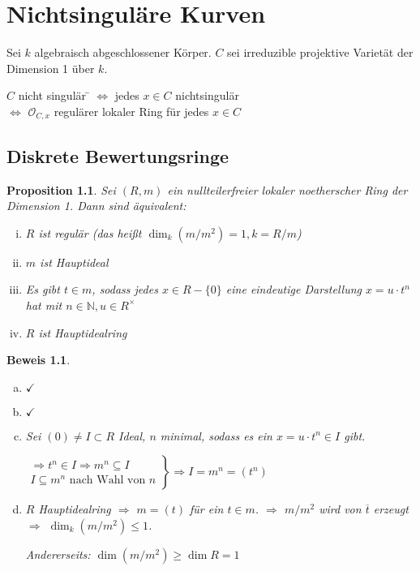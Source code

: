 \documentclass[a4paper, 12pt, numbers=noendperiod, chapterprefix=true]{scrbook}
\theoremstyle{break}
\newtheorem{Prop}[Def]{Proposition}
\theoremstyle{nonumberbreak}
\newtheorem{Bew}{Beweis}
\theoremstyle{nonumberplain}
\newcommand{\N}{\mathbb{N}}
\newcommand{\calO}{\mathcal{O}}
\begin{document}
\newpage

\chapter{Nichtsingul\"are Kurven}
\setcounter{section}{19}
Sei $k$ algebraisch abgeschlossener K\"orper. $C$ sei irreduzible projektive Variet\"at der Dimension 1 \"uber $k$.
\begin{tabbing}
$C$ nicht singul\"ar \= $\Leftrightarrow$ jedes $x\in C$ nichtsingul\"ar\\
\> $\Leftrightarrow$ $\calO_{C,x}$ regul\"arer lokaler Ring f\"ur jedes $x\in C$
\end{tabbing}

\section{Diskrete Bewertungsringe}

\begin{Prop}\label{20.1}
Sei $(R,m)$ ein nullteilerfreier lokaler noetherscher Ring der Dimension 1. Dann sind \"aquivalent:\begin{enumerate}[i)]
\item
	$R$ ist regul\"ar (das hei\ss t $\dim_k(m/m^2)=1, k=R/m$)
\item
	$m$ ist Hauptideal
\item
	Es gibt $t\in m$, sodass jedes $x\in R-\{0\}$ eine eindeutige Darstellung $x=u\cdot t^n$ hat mit $n\in \N, u\in R^\times$
\item
	$R$ ist Hauptidealring
\end{enumerate}\end{Prop}

\begin{Bew}\begin{enumerate}[(a) $\Rightarrow$ (a)]
\item[\underline{(i)$\Rightarrow$(ii)}:]$\checkmark$
\item[\underline{(ii)$\Rightarrow$(iii)}:]$\checkmark$
\item[\underline{(iii)$\Rightarrow$(iv)}:]
	Sei $(0)\ne I\subset R$ Ideal, $n$ minimal, sodass es ein $x=u\cdot t^n\in I$ gibt.
	
	$\left.\begin{array}{l}\Rightarrow t^n\in I\Rightarrow m^n\subseteq I\\I\subseteq m^n\text{ nach Wahl von }n\end{array}\right\}\Rightarrow I=m^n=(t^n)$
\item[\underline{(iv)$\Rightarrow$(i)}:]
	$R$ Hauptidealring $\Rightarrow$ $m=(t)$ f\"ur ein $t\in m$. $\Rightarrow$ $m/m^2$ wird von $\overline t$ erzeugt $\Rightarrow$ $\dim_k(m/m^2)\le 1$.
	
	Andererseits: $\dim(m/m^2)\ge\dim R=1$
\end{enumerate}\end{Bew}
\end{document}
